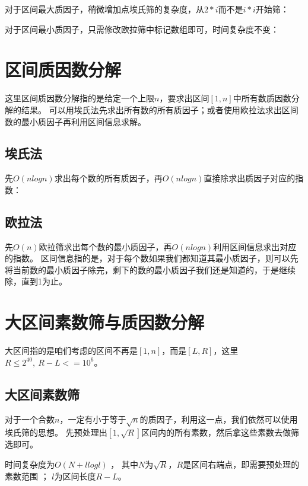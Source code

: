 对于区间最大质因子，稍微增加点埃氏筛的复杂度，从$2*i$而不是$i*i$开始筛：



对于区间最小质因子，只需修改欧拉筛中标记数组即可，时间复杂度不变：




\section{区间质因数分解}
这里区间质因数分解指的是给定一个上限$n$，要求出区间$[1,n]$中所有数质因数分解的结果。
可以用埃氏法先求出所有数的所有质因子；或者使用欧拉法求出区间数的最小质因子再利用区间信息求解。
\subsection{埃氏法}
先$O(nlogn)$求出每个数的所有质因子，再$O(nlogn)$直接除求出质因子对应的指数：



\subsection{欧拉法}
先$O(n)$欧拉筛求出每个数的{\heiti 最小质因子}，再$O(nlogn)$利用区间信息求出对应的指数。
区间信息指的是，对于每个数如果我们都知道其最小质因子，则可以先将当前数的最小质因子除完，剩下的数的最小质因子我们还是知道的，于是继续除，直到1为止。


\section{大区间素数筛与质因数分解}
大区间指的是咱们考虑的区间不再是$[1,n]$，而是$[L,R]$，这里$R\le 2^{40}, \  R-L<=10^6$。

\subsection{大区间素数筛}
对于一个合数$n$，一定有小于等于$\sqrt{n}$的质因子，利用这一点，我们依然可以使用埃氏筛的思想。
先预处理出$[1,\sqrt{R}]$区间内的所有素数，然后拿这些素数去做筛选即可。

时间复杂度为$O(N + llogl)$ ， 其中$N$为$\sqrt{R}$，$R$是区间右端点，即需要预处理的素数范围 ； $l$为区间长度$R-L$。

